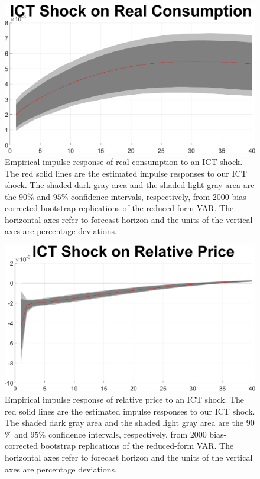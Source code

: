 \documentclass[12pt]{article}
\begin{document}
\newpage


	\begin{figure}[h!]
	\begin{center}
		\includegraphics[scale=0.35]{MainFigures/fig_ICT_Shock_on_Real_Consumption_empirical_noH}
		\caption{Empirical impulse response of real consumption to an ICT shock. The red solid lines are the estimated impulse responses to our ICT shock. The shaded dark gray area and the shaded light gray area are the $90$\% and $95$\% confidence intervals, respectively, from 2000 bias-corrected bootstrap replications of the reduced-form VAR. The horizontal axes refer to forecast horizon and the units of the vertical axes are percentage deviations.}
		\label{fig:C_main}
	\end{center} 
\end{figure}

\newpage


	\begin{figure}[h!]
	\begin{center}
		\includegraphics[scale=0.35]{MainFigures/fig_ICT_Shock_on_Relative_Price_empirical_noH}
		\caption{Empirical impulse response of relative price to an ICT shock. The red solid lines are the estimated impulse responses to our ICT shock. The shaded dark gray area and the shaded light gray area are the $90$\% and $95$\% confidence intervals, respectively, from 2000 bias-corrected bootstrap replications of the reduced-form VAR. The horizontal axes refer to forecast horizon and the units of the vertical axes are percentage deviations.}
		\label{fig:RP_main}
	\end{center} 
\end{figure}
\end{document}

